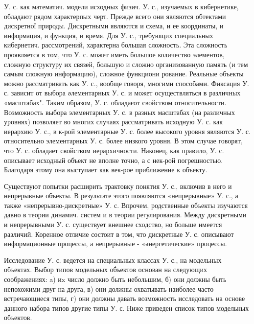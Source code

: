 \documentclass[10pt]{article}
\begin{document}
У. с. как математич. модели исходных физич. У. с., изучаемых в кибернетике, обладают рядом характерпых черт. Прежде всего они являются обтектами дискретної природы. Дискретными являются и схема, и ее координаты, и информация, и функция, и время. Для У. с., требующих специальных кибернетич. рассмотрений, характерна большая сложность. Эта сложность проявляется в том, что У. с. может иметь большое количество элементов, сложную структуру их связей, большую и сложно организованную память (и тем самым сложную информацию), сложное функциони рование. Реальные объекты можно рассматривать как У. с., вообще говоря, многими способами. Фиксация У. с. зависит от выбора әлементарных У. с. и может осуществляться в различных «масштабах". Таким образом, У. с. обладағот свойством относительности. Возможность выбора элементарных У. с. в разных масштабах (на различных уровнях) позволяет во многих случаях рассматривать исходную У. с. как иерархию У. с., в к-рой элементарные У. с. более высокого уровня являются У. с. относительно элементарных У. с. более низкого уровня. В этом случае говорят, что У. с. обладает свойством иерархичности. Наконец, как правило, У. с. описывает исходный объект не вполне точно, а с нек-рой погрешностью. Благодаря этому она выступает как век-рое приближение к объекту.



Существуют попытки расширить трактовку понятия У. с., включив в него и непрерывные объекты. В результате этого появляются «непрерывные» У. с., а также «непрерывно-дискретные» У. с. Впрочем, родственные объекты изучаются давно в теории динамич. систем и в теории регулирования. Между дискретными и непрерывными У. с. существует внешнее сходство, но больше имеется различий. Коренное отличие состоит в том, что дискретные У. с. описывают информационные процессы, а непрерывные - «әнергетические» процессы.



Исследование У. с. ведется на специальных классах У. с., на модельных объектах. Выбор типов модельных об́ъектов основан на следующих соображениях: a) иx число должно быть небольшим, б) они должны быть непохожими друг на друга, в) они должны охватывать наиболее часто встречающиеся типы, г) они должны давать возможность исследовать на основе данного набора типов другие типы У. с. Ниже приведен список типов модельных объектов.
\end{document}
